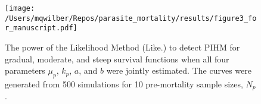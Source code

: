 \documentclass[12pt, a4paper]{article}
\begin{document}
\begin{figure}
    \texttt{[image: /Users/mqwilber/Repos/parasite\_mortality/results/figure3\_for\_manuscript.pdf]}

    \caption{The power of the Likelihood Method (Like.) to detect PIHM for gradual, moderate, and steep survival functions when all four parameters $\mu_p$, $k_p$, $a$, and $b$ were jointly estimated. The curves were generated from 500 simulations for 10 pre-mortality sample sizes, $N_p$.}

    \label{fig:real_power}

\end{figure}
\end{document}
